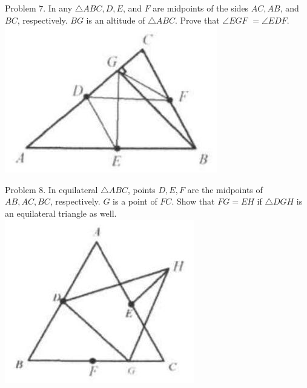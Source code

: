 \documentclass[10pt]{article}
\begin{document}
Problem 7. In any \(\triangle A B C, D, E\), and \(F\) are midpoints of the sides \(A C, A B\), and \(B C\), respectively. \(B G\) is an altitude of \(\triangle A B C\). Prove that \(\angle E G F\) \(=\angle E D F\).\\
\includegraphics[max width=\textwidth, center]{2025_04_17_97bc1f7e44d93c271a88g-045}

Problem 8. In equilateral \(\triangle A B C\), points \(D, E, F\) are the midpoints of \(A B, A C, B C\), respectively. \(G\) is a point of \(F C\). Show that \(F G=E H\) if \(\triangle D G H\) is an equilateral triangle as well.\\
\includegraphics[max width=\textwidth, center]{2025_04_17_97bc1f7e44d93c271a88g-045(3)}
\end{document}
